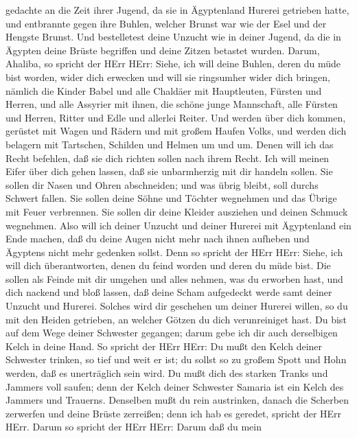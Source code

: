 gedachte an die Zeit ihrer Jugend, da sie in Ägyptenland Hurerei
getrieben hatte,  und entbrannte gegen ihre Buhlen, welcher
Brunst war wie der Esel und der Hengste Brunst.  Und
bestelletest deine Unzucht wie in deiner Jugend, da die in Ägypten deine
Brüste begriffen und deine Zitzen betastet wurden.  Darum,
Ahaliba, so spricht der HErr HErr: Siehe, ich will deine Buhlen, deren
du müde bist worden, wider dich erwecken und will sie ringsumher wider
dich bringen,  nämlich die Kinder Babel und alle Chaldäer
mit Hauptleuten, Fürsten und Herren, und alle Assyrier mit ihnen, die
schöne junge Mannschaft, alle Fürsten und Herren, Ritter und Edle und
allerlei Reiter.  Und werden über dich kommen, gerüstet mit
Wagen und Rädern und mit großem Haufen Volks, und werden dich belagern
mit Tartschen, Schilden und Helmen um und um. Denen will ich das Recht
befehlen, daß sie dich richten sollen nach ihrem Recht. 
Ich will meinen Eifer über dich gehen lassen, daß sie unbarmherzig mit
dir handeln sollen. Sie sollen dir Nasen und Ohren abschneiden; und was
übrig bleibt, soll durchs Schwert fallen. Sie sollen deine Söhne und
Töchter wegnehmen und das Übrige mit Feuer verbrennen.  Sie
sollen dir deine Kleider ausziehen und deinen Schmuck wegnehmen.
 Also will ich deiner Unzucht und deiner Hurerei mit
Ägyptenland ein Ende machen, daß du deine Augen nicht mehr nach ihnen
aufheben und Ägyptens nicht mehr gedenken sollst.  Denn so
spricht der HErr HErr: Siehe, ich will dich überantworten, denen du
feind worden und deren du müde bist.  Die sollen als Feinde
mit dir umgehen und alles nehmen, was du erworben hast, und dich nackend
und bloß lassen, daß deine Scham aufgedeckt werde samt deiner Unzucht
und Hurerei.  Solches wird dir geschehen um deiner Hurerei
willen, so du mit den Heiden getrieben, an welcher Götzen du dich
verunreiniget hast.  Du bist auf dem Wege deiner Schwester
gegangen; darum gebe ich dir auch derselbigen Kelch in deine Hand.
 So spricht der HErr HErr: Du mußt den Kelch deiner
Schwester trinken, so tief und weit er ist; du sollst so zu großem Spott
und Hohn werden, daß es unerträglich sein wird.  Du mußt
dich des starken Tranks und Jammers voll saufen; denn der Kelch deiner
Schwester Samaria ist ein Kelch des Jammers und Trauerns. 
Denselben mußt du rein austrinken, danach die Scherben zerwerfen und
deine Brüste zerreißen; denn ich hab es geredet, spricht der HErr HErr.
 Darum so spricht der HErr HErr: Darum daß du mein
